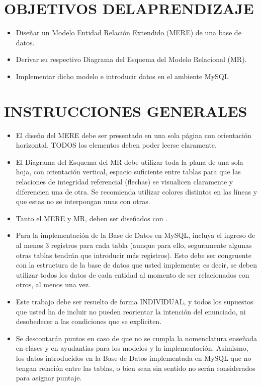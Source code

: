 \documentclass[letterpaper]{article}
\begin{document}
\section{OBJETIVOS DELAPRENDIZAJE}

\begin{itemize}
    \item Diseñar un Modelo Entidad Relación Extendido (MERE) de una base de datos.
    \item Derivar su respectivo Diagrama del Esquema del Modelo Relacional (MR).
    \item Implementar dicho modelo e introducir datos en el ambiente MySQL
\end{itemize}


\section{INSTRUCCIONES GENERALES}

\begin{itemize}
    \item El diseño del MERE debe ser presentado en una sola página con orientación horizontal. TODOS los elementos deben poder leerse claramente.
    \item El Diagrama del Esquema del MR debe utilizar toda la plana de una sola hoja, con orientación vertical, espacio suficiente entre tablas para que las relaciones de integridad referencial (flechas) se visualicen claramente y diferencien una de otra. Se recomienda utilizar colores distintos en las líneas y que estas no se interpongan unas con otras.
    \item Tanto el MERE y MR, deben ser diseñados con \Latex.
    \item Para la implementación de la Base de Datos en MySQL, incluya el ingreso de al menos 3 registros para cada tabla (aunque para ello, seguramente algunas otras tablas tendrán que introducir más registros). Esto debe ser congruente con la estructura de la base de datos que usted implemente; es decir, se deben utilizar todos los datos de cada entidad al momento de ser relacionados con otros, al menos una vez.
    \item Este trabajo debe ser resuelto de forma INDIVIDUAL, y todos los supuestos que usted ha de incluir no pueden reorientar la intención del enunciado, ni desobedecer a las condiciones que se expliciten.
    \item Se descontarán puntos en caso de que no se cumpla la nomenclatura enseñada en clases y en ayudantías para los modelos y la implementación. Asimismo, los datos introducidos en la Base de Datos implementada en MySQL que no tengan relación entre las tablas, o bien sean sin sentido no serán considerados para asignar puntaje.

\end{itemize}
\end{document}

